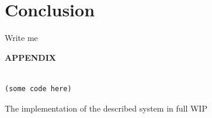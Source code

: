 \documentclass[oribibl]{llncs}
\begin{document}
\section{Conclusion}
\label{sec:conclusion}
Write me 

\newpage
\nocite{*}



\newpage
    \begin{center}
      {\bf APPENDIX}
    \end{center}
\label{sec:appendix}

\begin{listing}[]%
\begin{verbatim}

(some code here)

\end{verbatim}
\caption{The implementation of the described system in full WIP}
\label{lst:entire-implementation}
\end{listing}
\end{document}
